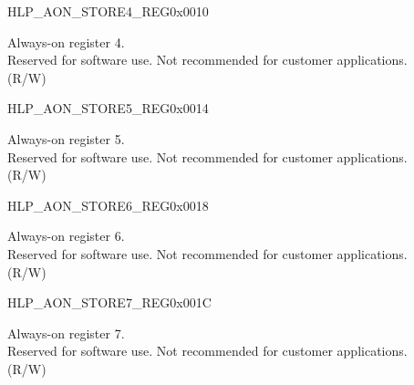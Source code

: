 \begin{register}{H}{LP\_AON\_STORE4\_REG}{0x0010}\label{regdesc:LPAONSTORE4REG}
%
\regnewline%
\begin{regdesc}\begin{reglist}
\label{fielddesc:LPAONLPAONSTORE4}\item [LP\_AON\_LP\_AON\_STORE4] Always-on register 4.\\
Reserved for software use. Not recommended for customer applications.\\
(R/W)
\end{reglist}\end{regdesc}
\end{register}

\begin{register}{H}{LP\_AON\_STORE5\_REG}{0x0014}\label{regdesc:LPAONSTORE5REG}
%
\regnewline%
\begin{regdesc}\begin{reglist}
\label{fielddesc:LPAONLPAONSTORE5}\item [LP\_AON\_LP\_AON\_STORE5] Always-on register 5.\\
Reserved for software use. Not recommended for customer applications.\\
(R/W)
\end{reglist}\end{regdesc}
\end{register}

\begin{register}{H}{LP\_AON\_STORE6\_REG}{0x0018}\label{regdesc:LPAONSTORE6REG}
%
\regnewline%
\begin{regdesc}\begin{reglist}
\label{fielddesc:LPAONLPAONSTORE6}\item [LP\_AON\_LP\_AON\_STORE6] Always-on register 6.\\
Reserved for software use. Not recommended for customer applications.\\
(R/W)
\end{reglist}\end{regdesc}
\end{register}

\begin{register}{H}{LP\_AON\_STORE7\_REG}{0x001C}\label{regdesc:LPAONSTORE7REG}
%
\regnewline%
\begin{regdesc}\begin{reglist}
\label{fielddesc:LPAONLPAONSTORE7}\item [LP\_AON\_LP\_AON\_STORE7] Always-on register 7.\\
Reserved for software use. Not recommended for customer applications.\\
(R/W)
\end{reglist}\end{regdesc}
\end{register}


